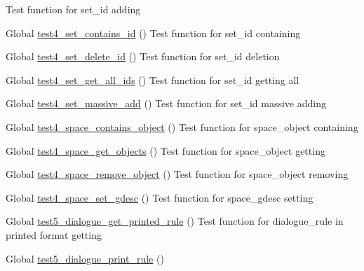\begin{DoxyRefList}
%
Test function for set\+\_\+id adding  
\item[Global \mbox{\hyperlink{set__test_8c_ae3c9c7be47682b263ca7f3ac798b43cc}{test4\+\_\+set\+\_\+contains\+\_\+id}} ()]\label{test__test000655}%
%
Test function for set\+\_\+id containing  
\item[Global \mbox{\hyperlink{set__test_8c_aad901167f90dca86e60efeaea86939f3}{test4\+\_\+set\+\_\+delete\+\_\+id}} ()]\label{test__test000648}%
%
Test function for set\+\_\+id deletion  
\item[Global \mbox{\hyperlink{set__test_8c_aed9fd4ab819ba161091f0a825485386b}{test4\+\_\+set\+\_\+get\+\_\+all\+\_\+ids}} ()]\label{test__test000659}%
%
Test function for set\+\_\+id getting all  
\item[Global \mbox{\hyperlink{set__test_8c_af015bb7816af5b9b8d3e301f415e34f7}{test4\+\_\+set\+\_\+massive\+\_\+add}} ()]\label{test__test000643}%
%
Test function for set\+\_\+id massive adding  
\item[Global \mbox{\hyperlink{space__test_8c_a789fc777e653b3e4eef06e57fb4360f3}{test4\+\_\+space\+\_\+contains\+\_\+object}} ()]\label{test__test000693}%
%
Test function for space\+\_\+object containing  
\item[Global \mbox{\hyperlink{space__test_8c_a458803c0685fc5c8355172da82be0e24}{test4\+\_\+space\+\_\+get\+\_\+objects}} ()]\label{test__test000697}%
%
Test function for space\+\_\+object getting  
\item[Global \mbox{\hyperlink{space__test_8c_ab13db1b36b5af05c202434913df34283}{test4\+\_\+space\+\_\+remove\+\_\+object}} ()]\label{test__test000688}%
%
Test function for space\+\_\+object removing  
\item[Global \mbox{\hyperlink{space__test_8c_a187d250c44277a39ca324c773e62544d}{test4\+\_\+space\+\_\+set\+\_\+gdesc}} ()]\label{test__test000701}%
%
Test function for space\+\_\+gdesc setting  
\item[Global \mbox{\hyperlink{dialogue__test_8c_a4d719a67a4303667266cc33c9569385c}{test5\+\_\+dialogue\+\_\+get\+\_\+printed\+\_\+rule}} ()]\label{test__test000071}%
%
Test function for dialogue\+\_\+rule in printed format getting  
\item[Global \mbox{\hyperlink{dialogue__test_8c_ab9232e35b82373d7bce807b822638676}{test5\+\_\+dialogue\+\_\+print\+\_\+rule}} ()]\label{test__test000061}%

\end{DoxyRefList}
